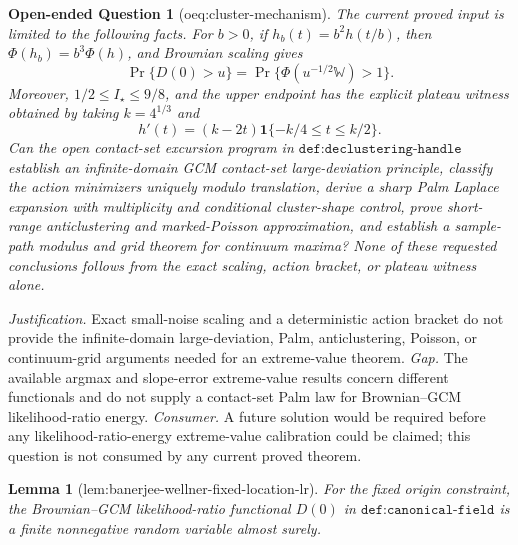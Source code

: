 \documentclass{article}
\newtheorem{lemma}{Lemma}
\newtheorem{openendedquestion}{Open-ended Question}
\begin{document}
\begin{openendedquestion}[oeq:cluster-mechanism]\label{oeq:cluster-mechanism}
The current proved input is limited to the following facts.  For \(b>0\), if \(h_b(t)=b^2h(t/b)\), then \(\Phi(h_b)=b^3\Phi(h)\), and Brownian scaling gives
\[
 \Pr\{D(0)>u\}=\Pr\{\Phi(u^{-1/2}\mathbb W)>1\}.
\]
Moreover, \(1/2\le I_\star\le9/8\), and the upper endpoint has the explicit plateau witness obtained by taking \(k=4^{1/3}\) and
\[
 h'(t)=(k-2t)\mathbf 1\{-k/4\le t\le k/2\}.
\]
Can the open contact-set excursion program in \(\texttt{def:declustering-handle}\) establish an infinite-domain GCM contact-set large-deviation principle, classify the action minimizers uniquely modulo translation, derive a sharp Palm Laplace expansion with multiplicity and conditional cluster-shape control, prove short-range anticlustering and marked-Poisson approximation, and establish a sample-path modulus and grid theorem for continuum maxima?  None of these requested conclusions follows from the exact scaling, action bracket, or plateau witness alone.
\end{openendedquestion}
\par\smallskip\noindent \textit{Justification.} Exact small-noise scaling and a deterministic action bracket do not provide the infinite-domain large-deviation, Palm, anticlustering, Poisson, or continuum-grid arguments needed for an extreme-value theorem. \textit{Gap.} The available argmax and slope-error extreme-value results concern different functionals and do not supply a contact-set Palm law for Brownian--GCM likelihood-ratio energy. \textit{Consumer.} A future solution would be required before any likelihood-ratio-energy extreme-value calibration could be claimed; this question is not consumed by any current proved theorem.

\begin{lemma}[lem:banerjee-wellner-fixed-location-lr]\label{lem:banerjee-wellner-fixed-location-lr}
For the fixed origin constraint, the Brownian--GCM likelihood-ratio functional \(D(0)\) in \(\texttt{def:canonical-field}\) is a finite nonnegative random variable almost surely.
\end{lemma}
\end{document}
